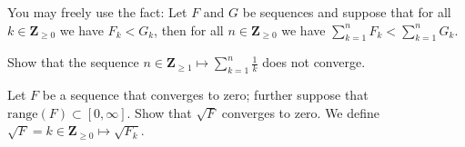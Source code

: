 \documentclass[12pt,fleqn]{exam}
\newcommand{\range}{\mathrm{range}}
\newcommand{\integers}{\mathbf{Z}}
\begin{document}
\begin{questions}
You may freely use the fact: Let $F$ and $G$ be sequences and suppose 
that for all $k \in \integers_{\geq 0}$ we have $F_k < G_k$, then
for all $n \in \integers_{\geq 0}$ we have 
$\sum_{k=1}^n F_k < \sum_{k=1}^n G_k$. 

\begin{solution}

    
\end{solution}
\question[10] Show that the sequence $n \in \integers_{\geq 1} \mapsto 
\sum_{k=1}^n \frac{1}{k}$ does not converge.
\begin{solution}
\end{solution}

\question[10] Let $F$ be a sequence that converges to zero; 
further suppose that $\range(F) \subset [0,\infty]$. Show that $\sqrt{F}$
converges to zero. We define $\sqrt{F} = k \in \integers_{\geq 0} 
\mapsto \sqrt{F_k}$.
\begin{solution}
\end{solution}

\end{questions}
\end{document}
